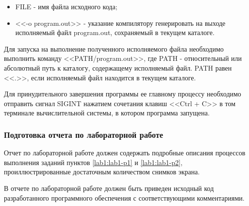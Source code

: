 	\begin{itemize}

		\item FILE - имя файла исходного кода;
		\item <<-o program.out>> - указание компилятору генерировать на выходе исполняемый файл program.out,
		сохраняемый в текущем каталоге.

	\end{itemize}

	Для запуска на выполнение полученного исполняемого файла необходимо выполнить команду <<PATH/program.out>>,
	где PATH - относительный или абсолютный путь к каталогу, содержащему исполняемый файл.
	PATH равен <<.>>, если исполняемый файл находится в текущем каталоге.

	Для принудительного завершения программы ее главному процессу необходимо отправить сигнал SIGINT нажатием сочетания клавиш <<Ctrl + C>> в том терминале
	вычислительной системы, в котором программа запущена.

\subsubsection{Подготовка отчета по лабораторной работе}

	Отчет по лабораторной работе должен содержать подробные описания процессов выполнения заданий пунктов
	\ref{lab1:lab1-p1} и \ref{lab1:lab1-p2}, проиллюстрированные достаточным количеством снимков экрана.

	В отчете по лабораторной работе должен быть приведен исходный код разработанного программного обеспечения с
	соответствующими комментариями.


